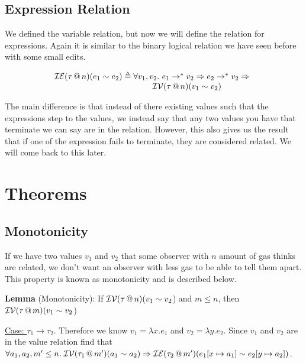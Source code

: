 \documentclass{lecturenotes}
\makeatletter
\newcommand{\spa}{\mkern5mu}
\newcommand{\inval}[4]{\ensuremath{\mathcal{I}\mathcal{V}(#1 \mkern3mu @ \mkern3mu #2)(#3 \sim #4})}
\newcommand{\inexpr}[4]{\ensuremath{\mathcal{I}\mathcal{E}(#1 \mkern3mu @ \mkern3mu #2)(#3 \sim #4})}
\makeatother
\begin{document}
\subsection{Expression Relation}

We defined the variable relation, but now we will define the relation for expressions. 
  Again it is similar to the binary logical relation we have seen before with some small edits. 

$$\begin{array}{r@{\;\triangleq\;}l} 
  \inexpr{\tau}{n}{e_1}{e_2} 
    & \forall v_1, v_2.\, \hspace{-1.5em}
    \begin{array}[t]{l}\hspace{1.15em}
      e_1 \to^* v_2 \Rightarrow e_2 \to^* v_2 \Rightarrow \\
      {} \inval{\tau}{n}{v_1}{v_2}\\
    \end{array}  
\end{array}$$

The main difference is that instead of there existing values such that the expressions step to the values, we instead say that any two values you have that terminate we can say are in the relation. 
  However, this also gives us the result that if one of the expression fails to terminate, they are considered related. 
  We will come back to this later. 

\section{Theorems}

\subsection{Monotonicity}

If we have two values $v_1$ and $v_2$ that some observer with $n$ amount of gas thinks are related, we don't want an observer with less gas to be able to tell them apart. 
  This property is known as monotonicity and is described below.

\textbf{Lemma} (Monotonicity): If \inval{\tau}{n}{v_1}{v_2} and $m \leq n$, then \inval{\tau}{m}{v_1}{v_2}

\underline{Case: $\tau_1 \to \tau_2$}. Therefore we know $v_1 = \lambda x.e_1$ and $v_2 = \lambda y.e_2$. 
  Since $v_1$ and $v_2$ are in the value relation find that $\forall a_1, a_2, m' \leq n. \spa \inval{\tau_1}{m'}{a_1}{a_2} \Rightarrow \inexpr{\tau_2}{m'}{e_1[x \mapsto a_1]}{e_2[y \mapsto a_2]}$.
 
\end{document}
